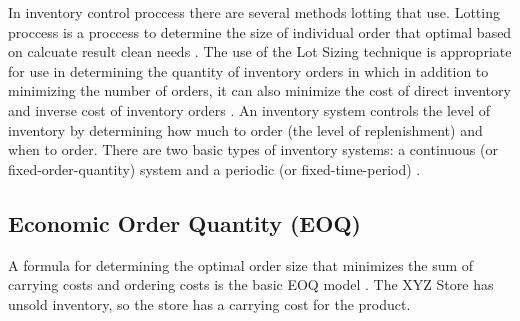 \documentclass[12pt,a4paper,final]{iopart}
\begin{document}
In inventory control proccess there are several methods lotting that use. Lotting proccess is a proccess to determine the size of individual order that optimal based on calcuate result clean needs \cite{Ibrahim}. The use of the Lot Sizing technique is appropriate for use in determining the quantity of inventory orders in which in addition to minimizing the number of orders, it can also minimize the cost of direct inventory and inverse cost of inventory orders \cite{Djunaidi2019}. An inventory system controls the level of inventory by determining how much to order (the level of replenishment) and when to order. There are two basic types of inventory systems: a continuous (or fixed-order-quantity) system and a periodic (or fixed-time-period) \cite{Rusell2011}. 



\subsection{Economic Order Quantity (EOQ)}
A formula for determining the optimal order size that minimizes the sum of carrying costs and ordering costs is the basic EOQ model \cite{Rusell2011}. The XYZ Store has unsold inventory, so the store has a carrying cost for the product.
\end{document}
